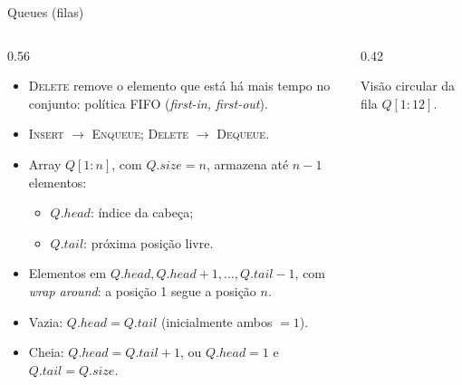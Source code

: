 \documentclass[aspectratio=169,10pt]{beamer}
\newcommand{\proc}[1]{\textnormal{\rmfamily\textsc{#1}}}
\newcommand{\at}[1]{.\mathit{#1}}
\begin{document}
\begin{frame}{Queues (filas)}
  \begin{columns}[c]
    \begin{column}{0.56\textwidth}
      \begin{itemize}
        \item \proc{Delete} remove o elemento que está \alert{há mais tempo} no conjunto:
              política \alert{FIFO} (\emph{first-in, first-out}).
        \item \proc{Insert} $\to$ \proc{Enqueue}; \proc{Delete} $\to$ \proc{Dequeue}.
        \item Array $Q[1:n]$, com $Q\at{size}=n$, armazena até $n-1$ elementos:
          \begin{itemize}
            \item $Q\at{head}$: índice da cabeça;
            \item $Q\at{tail}$: próxima posição livre.
          \end{itemize}
        \item Elementos em $Q\at{head}, Q\at{head}+1, \dots, Q\at{tail}-1$, com
              \alert{\emph{wrap around}}: a posição 1 segue a posição $n$.
        \item Vazia: $Q\at{head}=Q\at{tail}$ (inicialmente ambos $=1$).
        \item Cheia: $Q\at{head}=Q\at{tail}+1$, ou $Q\at{head}=1$ e $Q\at{tail}=Q\at{size}$.
      \end{itemize}
    \end{column}
    \begin{column}{0.42\textwidth}
      \centering

      {\scriptsize Visão circular da fila $Q[1:12]$.}
    \end{column}
  \end{columns}
\end{frame}
\end{document}
